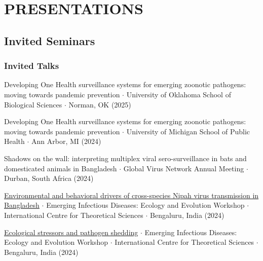 \documentclass{cv}
\begin{document}



\section*{PRESENTATIONS}

\subsection*{Invited Seminars}

\subsubsection*{Invited Talks}

Developing One Health surveillance systems for emerging zoonotic pathogens: moving towards pandemic prevention $\cdot$ University of Oklahoma School of Biological Sciences $\cdot$ Norman, OK (2025)

Developing One Health surveillance systems for emerging zoonotic pathogens: moving towards pandemic prevention $\cdot$ University of Michigan School of Public Health $\cdot$ Ann Arbor, MI (2024)

Shadows on the wall: interpreting multiplex viral sero-surveillance in bats and domesticated animals in Bangladesh $\cdot$ Global Virus Network Annual Meeting $\cdot$ Durban, South Africa (2024)

\href{https://www.youtube.com/live/MOgTl1EUSes?si=iMqpRzL8OlzRsdlE}{Environmental and behavioral drivers of cross-species Nipah virus transmission in Bangladesh} $\cdot$ 
Emerging Infectious Diseases: Ecology and Evolution Workshop $\cdot$ International Centre for Theoretical Sciences $\cdot$ Bengaluru, India (2024)

\href{https://www.youtube.com/live/WlhZYbyfGiw?si=1AW1gtXbbL0bbaPp}{Ecological stressors and pathogen shedding} $\cdot$ Emerging Infectious Diseases: Ecology and Evolution Workshop $\cdot$ International Centre for Theoretical Sciences $\cdot$ Bengaluru, India (2024)
\end{document}
